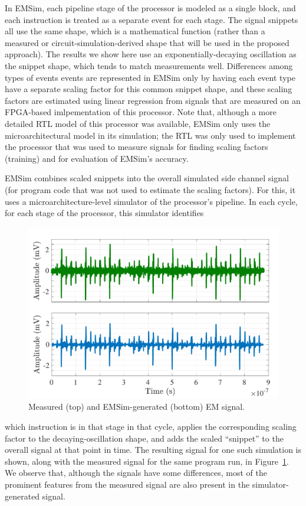 In EMSim, each pipeline stage of the processor is modeled as a single block, and each instruction is treated as a separate event for each stage. The signal snippets all use the same shape, which is a mathematical function (rather than a measured or circuit-simulation-derived shape that will be used in the proposed approach). 
The results we show here use an exponentially-decaying oscillation as the snippet shape,
which tends to match measurements well.
Differences among types of events events are represented in EMSim only by having each event type have a separate scaling factor for this common snippet shape, and
these scaling factors are estimated using linear regression from signals that are measured on an FPGA-based imlpementation of this processor. Note that, although a more detailed RTL model of this processor was available, EMSim only uses the microarchitectural model in its simulation; the RTL was only used to implement the processor that was used to measure signals for finding scaling factors (training) and for evaluation of EMSim's accuracy.

EMSim combines scaled snippets into the overall simulated side channel signal (for program code that was not used to estimate the scaling factors). For this, it uses a microarchitecture-level simulator of the processor's pipeline.
In each cycle, for each stage of the processor, this simulator identifies
\begin{figure}
	\centering
		\vspace{-0.15in}
	\includegraphics[width=0.45\columnwidth,clip]{figure/bench.pdf}
	\vspace{-0.3in}
	\caption{Measured (top) and EMSim-generated (bottom) EM signal.}
	\label{fig:bench}
	\vspace{-0.1in}
\end{figure}
 which instruction is in that stage in that cycle, applies the corresponding scaling factor to the
decaying-oscillation shape, and adds the scaled ``snippet'' to the overall signal at that point in time.
The resulting signal for one such simulation is shown, along with the measured signal for the same program run, in Figure~\ref{fig:bench}. We observe that, although the signals have some differences, most of the prominent features from the measured signal are also present in the simulator-generated signal.

